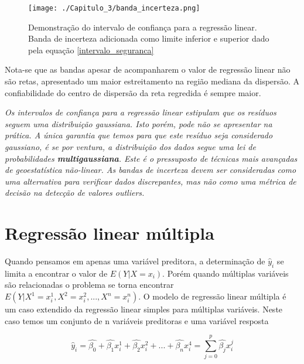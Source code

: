   \begin{figure}[H]
  	\centering
  	\texttt{[image: ./Capitulo\_3/banda\_incerteza.png]}	
  	\caption{Demonstração do intervalo de confiança para a regressão linear. Banda de incerteza adicionada como limite inferior e superior dado pela equação \eqref{intervalo_seguranca} }
  	\label{inter_seg}
  \end{figure}
  
  Nota-se que as bandas apesar de acompanharem o valor de regressão linear não são retas, apresentado um maior estreitamento na região mediana da dispersão. A confiabilidade do centro de dispersão da reta regredida é sempre maior. 
  
 \begin{proposition}
 \textit{Os intervalos de confiança para a regressão linear estipulam que os resíduos seguem uma distribuição gaussiana. Isto porém, pode não se apresentar na prática. A única garantia que temos para que este resíduo seja considerado gaussiano, é se por ventura, a distribuição dos dados segue uma lei de probabilidades \textbf{multigaussiana}. Este é o pressuposto de técnicas mais avançadas de geoestatística não-linear. As bandas de incerteza devem ser consideradas como uma alternativa para verificar dados discrepantes, mas não como uma métrica de decisão na detecção de valores outliers.} 
 
\end{proposition}
  

  
 \section{Regressão linear múltipla}
 
 Quando pensamos em apenas uma variável preditora, a determinação de $\hat{y}_{i}$ se limita a encontrar o valor de $E(Y|X=x_{i})$. Porém quando múltiplas variáveis são relacionadas o problema se torna encontrar $E(Y|X^{1}=x^{1}_{i},X^{2}=x^{2}_{i},...,X^{n}=x^{n}_{i})$. O modelo de regressão linear múltipla é um caso extendido da regressão linear simples para múltiplas variáveis. Neste caso temos um conjunto de n variáveis preditoras e uma variável resposta
 
  \begin{equation}\label{eq1:Metodo_dos_minimos_quad}
  \hat{y}_{i} = \hat{\beta_{0}} + \hat{\beta_{1}} x^{1}_{i} + \hat{\beta_{2}} x^{2}_{i} + ... + \hat{\beta_{n}} x^{4}_{i} = \sum_{j=0}^{p} \hat{\beta_{j}} x^{j}_{i}
  \end{equation} 
  


